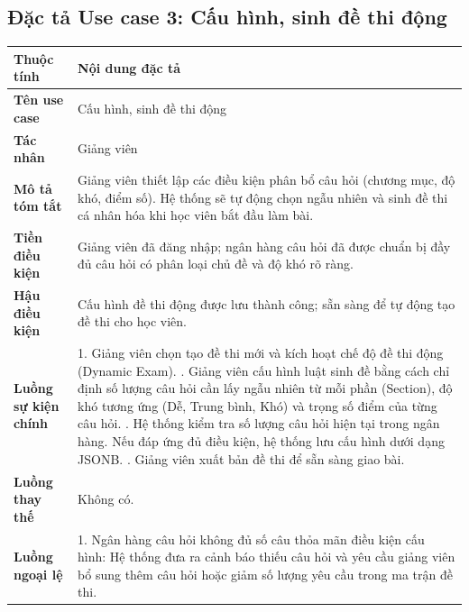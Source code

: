 \documentclass[../DoAn.tex]{subfiles}
\begin{document}
\subsection{Đặc tả Use case 3: Cấu hình, sinh đề thi động}
\nopagebreak
\begingroup
\centering
\fontsize{11pt}{14pt}\selectfont
\begin{tabular}{|p{3.2cm}|p{10.8cm}|}
\hline
\textbf{Thuộc tính} & \textbf{Nội dung đặc tả} \\ \hline
\textbf{Tên use case} & Cấu hình, sinh đề thi động \\ \hline
\textbf{Tác nhân} & Giảng viên \\ \hline
\textbf{Mô tả tóm tắt} & Giảng viên thiết lập các điều kiện phân bổ câu hỏi (chương mục, độ khó, điểm số). Hệ thống sẽ tự động chọn ngẫu nhiên và sinh đề thi cá nhân hóa khi học viên bắt đầu làm bài. \\ \hline
\textbf{Tiền điều kiện} & Giảng viên đã đăng nhập; ngân hàng câu hỏi đã được chuẩn bị đầy đủ câu hỏi có phân loại chủ đề và độ khó rõ ràng. \\ \hline
\textbf{Hậu điều kiện} & Cấu hình đề thi động được lưu thành công; sẵn sàng để tự động tạo đề thi cho học viên. \\ \hline
\textbf{Luồng sự kiện chính} & 
1. Giảng viên chọn tạo đề thi mới và kích hoạt chế độ đề thi động (Dynamic Exam). \newline
2. Giảng viên cấu hình luật sinh đề bằng cách chỉ định số lượng câu hỏi cần lấy ngẫu nhiên từ mỗi phần (Section), độ khó tương ứng (Dễ, Trung bình, Khó) và trọng số điểm của từng câu hỏi. \newline
3. Hệ thống kiểm tra số lượng câu hỏi hiện tại trong ngân hàng. Nếu đáp ứng đủ điều kiện, hệ thống lưu cấu hình dưới dạng JSONB. \newline
4. Giảng viên xuất bản đề thi để sẵn sàng giao bài. \\ \hline
\textbf{Luồng thay thế} & Không có. \\ \hline
\textbf{Luồng ngoại lệ} & 
1. Ngân hàng câu hỏi không đủ số câu thỏa mãn điều kiện cấu hình: Hệ thống đưa ra cảnh báo thiếu câu hỏi và yêu cầu giảng viên bổ sung thêm câu hỏi hoặc giảm số lượng yêu cầu trong ma trận đề thi. \\ \hline
\end{tabular}
\label{table:uc_configure_dynamic_exam}
\par
\endgroup
\end{document}
